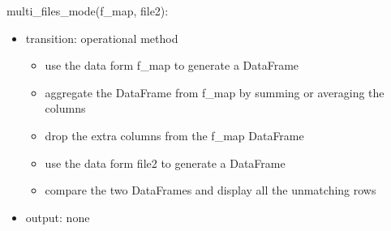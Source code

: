 \documentclass[12pt]{article}
\begin{document}
\noindent multi\_files\_mode(f\_map, file2):
\begin{itemize}
  \item transition: operational method 
  \begin{itemize}[\null]
    \item use the data form f\_map to generate a DataFrame
    \item aggregate the DataFrame from f\_map by summing or averaging the columns
    \item drop the extra columns from the f\_map DataFrame
    \item use the data form file2 to generate a DataFrame
    \item compare the two DataFrames and display all the unmatching rows
  \end{itemize}
  \item output: none
\end{itemize}
\end{document}
